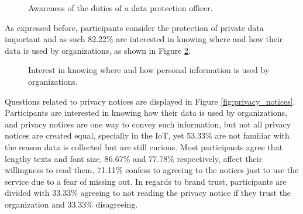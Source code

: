 \begin{figure}[H]
    \centering
    \caption{Awareness of the duties of a data protection officer.}
    \label{fig:aware_dpo}
\end{figure}

As expressed before, participants consider the protection of private data important
and as such 82.22\% are interested in knowing where and how their data is used by
organizations, as shown in Figure \ref{fig:interested_where_how_information_used}.

\begin{figure}
    \centering
    \caption{Interest in knowing where and how personal information is used by organizations.}
    \label{fig:interested_where_how_information_used}
\end{figure}

Questions related to privacy notices are displayed in Figure \ref{fig:privacy_notices}.
Participants are interested in knowing how their data is used by organizations,
and privacy notices are one way to convey such information, but not all privacy
notices are created equal, specially in the IoT, yet 53.33\% are not familiar with
the reason data is collected but are still curious. Most participants agree that
lengthy texts and font size, 86.67\% and 77.78\% respectively, affect their
willingness to read them, 71.11\% confess to agreeing to the notices just to use
the service due to a fear of missing out. In regards to brand trust, participants
are divided with 33.33\% agreeing to not reading the privacy notice if they trust
the organization and 33.33\% disagreeing.

